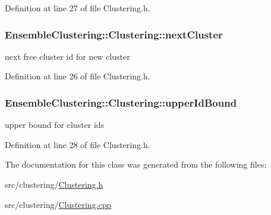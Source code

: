 Definition at line 27 of file Clustering.\-h.

\hypertarget{class_ensemble_clustering_1_1_clustering_a47de59cf22e93a801cac55eb001b6d3d}{
\subsubsection[{next\-Cluster}]{ Ensemble\-Clustering\-::\-Clustering\-::next\-Cluster\hspace{0.3cm}{\ttfamily [protected]}}}\label{class_ensemble_clustering_1_1_clustering_a47de59cf22e93a801cac55eb001b6d3d}


next free cluster id for new cluster 



Definition at line 26 of file Clustering.\-h.

\hypertarget{class_ensemble_clustering_1_1_clustering_a59e76a2bdf80c98186938c46814b9e36}{
\subsubsection[{upper\-Id\-Bound}]{ Ensemble\-Clustering\-::\-Clustering\-::upper\-Id\-Bound\hspace{0.3cm}{\ttfamily [protected]}}}\label{class_ensemble_clustering_1_1_clustering_a59e76a2bdf80c98186938c46814b9e36}


upper bound for cluster ids 



Definition at line 28 of file Clustering.\-h.



The documentation for this class was generated from the following files\-:\begin{DoxyCompactItemize}
\item 
src/clustering/\hyperlink{_clustering_8h}{Clustering.\-h}\item 
src/clustering/\hyperlink{_clustering_8cpp}{Clustering.\-cpp}\end{DoxyCompactItemize}
